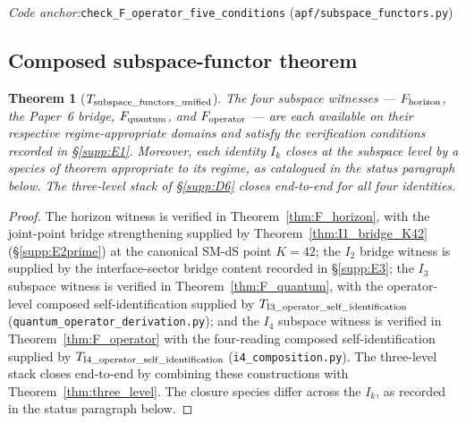 \documentclass[11pt]{article}
\theoremstyle{plain}
\newtheorem{theorem}{Theorem}[section]
\theoremstyle{definition}
\theoremstyle{remark}
\newcommand{\coderef}[2]{\par\noindent\textit{Code anchor:}\quad\texttt{#1} (\texttt{#2})}
\begin{document}
\coderef{check\_F\_operator\_five\_conditions}{apf/subspace\_functors.py}

\bigskip

\subsection{Composed subspace-functor theorem}\label{supp:E6}

\begin{theorem}[$T_{\rm subspace\_functors\_unified}$]\label{thm:subspace_unified}
The four subspace witnesses --- $F_{\rm horizon}$, the Paper~6 bridge, $F_{\rm quantum}$, and $F_{\rm operator}$ --- are each available on their respective regime-appropriate domains and satisfy the verification conditions recorded in \S\ref{supp:E1}.  Moreover, each identity $I_k$ closes at the subspace level by a species of theorem appropriate to its regime, as catalogued in the status paragraph below.  The three-level stack of \S\ref{supp:D6} closes end-to-end for all four identities.
\end{theorem}

\begin{proof}
The horizon witness is verified in Theorem~\ref{thm:F_horizon}, with the joint-point bridge strengthening supplied by Theorem~\ref{thm:I1_bridge_K42} (\S\ref{supp:E2prime}) at the canonical SM-dS point $K = 42$; the $I_2$ bridge witness is supplied by the interface-sector bridge content recorded in \S\ref{supp:E3}; the $I_3$ subspace witness is verified in Theorem~\ref{thm:F_quantum}, with the operator-level composed self-identification supplied by $T_{\rm I3\_operator\_self\_identification}$ (\texttt{quantum\_operator\_derivation.py}); and the $I_4$ subspace witness is verified in Theorem~\ref{thm:F_operator} with the four-reading composed self-identification supplied by $T_{\rm I4\_operator\_self\_identification}$ (\texttt{i4\_composition.py}).  The three-level stack closes end-to-end by combining these constructions with Theorem~\ref{thm:three_level}.  The closure species differ across the $I_k$, as recorded in the status paragraph below.
\end{proof}
\end{document}
